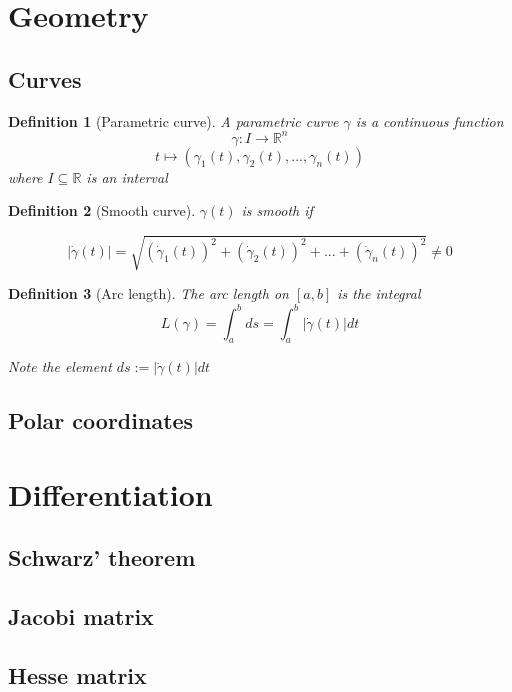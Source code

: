 \documentclass{article}
\theoremstyle{plain}
\newtheorem{definition}{Definition}
\begin{document}
\section{Geometry}

\subsection{Curves}

\begin{definition}[Parametric curve]
    A parametric curve $\gamma$ is a continuous function
    $$\gamma: I \rightarrow \mathbb R^n$$
    $$ t \mapsto (\gamma_1(t), \gamma_2(t), ..., \gamma_n(t))$$
    where $I \subseteq \mathbb R$ is an interval
    
\end{definition}

\begin{definition}[Smooth curve]
    $\gamma(t)$ is smooth if

    $$|\dot{\gamma}(t)| = \sqrt{(\dot \gamma_1(t))^2 + (\dot \gamma_2(t))^2 + ... + (\dot \gamma_n(t))^2} \neq 0$$
    
\end{definition}

\begin{definition}[Arc length]
    The arc length on $[a, b]$ is the integral
    $$L(\gamma) = \int^{b}_{a} ds = \int^{b}_{a} |\dot{\gamma}(t)| dt $$

    Note the element $ ds :=|\dot{\gamma}(t)| dt$

    
\end{definition}
\subsection{Polar coordinates}


\section{Differentiation}

\subsection{Schwarz' theorem}

\subsection{Jacobi matrix}

\subsection{Hesse matrix}
\end{document}
